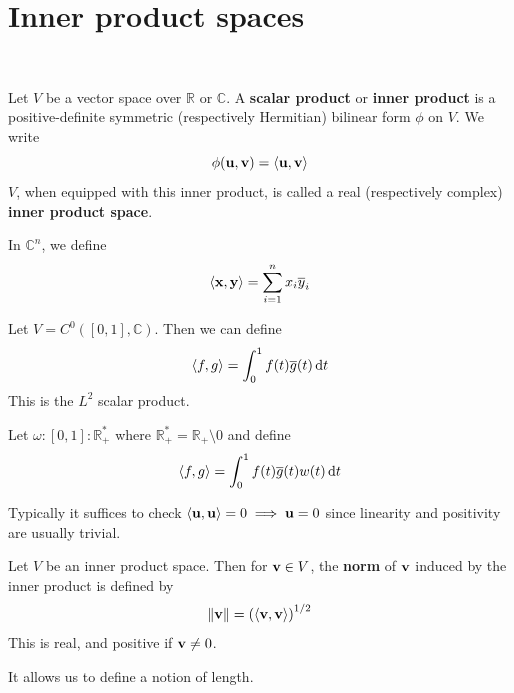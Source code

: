 \documentclass[a4paper,11pt]{article}
\begin{document}
\section{Inner product spaces}
\ \vspace*{-1.5em}
\begin{definition}
	Let \( V \) be a vector space over \( \mathbb R \) or \( \mathbb C \).
	A \textbf{scalar product} or \textbf{inner product} is a positive-definite symmetric (respectively Hermitian) bilinear form \( \phi \) on \( V \).
	We write
	\[
		\phi({\bf u},{\bf v}) = \left\langle{{\bf u},{\bf v}}\right\rangle
	\]
	\( V \), when equipped with this inner product, is called a real (respectively complex) \textbf{inner product space}.
\end{definition}
\begin{example}
	In \( \mathbb C^n \), we define
	\[
		\left\langle{{\bf x},{\bf y}}\right\rangle = \sum_{i=1}^n x_i \overline y_i
	\]
\end{example}
\begin{example}
	Let \( V = C^0([0,1], \mathbb C) \).
	Then we can define
	\[
		\left\langle{f,g}\right\rangle = \int_0^1 f(t) \overline g(t) \dd{t}
	\]
	This is the \( L^2 \) scalar product.
\end{example}
\begin{example}
	Let \( \omega \colon [0,1] \colon \mathbb R^*_+ \) where \( \mathbb R^*_+ = \mathbb R_+ \setminus \qty{0} \) and define
	\[
		\left\langle{f,g}\right\rangle = \int_0^1 f(t) \overline g(t) w(t) \dd{t}
	\]
\end{example}
\begin{remark}
	Typically it suffices to check \( \left\langle{{\bf u},{\bf u}}\right\rangle = 0 \implies {\bf u} = 0 \) since linearity and positivity are usually trivial.
\end{remark}
\begin{definition}
	Let \( V \) be an inner product space.
	Then for \( {\bf v} \in V \), the \textbf{norm} of \( {\bf v} \) induced by the inner product is defined by
	\[
		\norm{{\bf v}} = \qty(\left\langle{{\bf v},{\bf v}}\right\rangle)^{1/2}
	\]
	This is real, and positive if \( {\bf v} \neq 0 \).
\end{definition}
It allows us to define a notion of length. 
\end{document}
